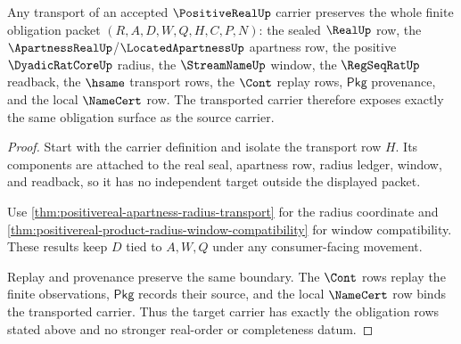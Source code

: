\begin{theorem}
\label{thm:positive-real-carrier-transport}
Any transport of an accepted $\PositiveRealUp$ carrier preserves the whole
finite obligation packet
$(R,A,D,W,Q,H,C,P,N)$: the sealed $\RealUp$ row, the
$\ApartnessRealUp$/$\LocatedApartnessUp$ apartness row, the positive
$\DyadicRatCoreUp$ radius, the $\StreamNameUp$ window, the $\RegSeqRatUp$
readback, the $\hsame$ transport rows, the $\Cont$ replay rows,
$\mathsf{Pkg}$ provenance, and the local $\NameCert$ row. The transported
carrier therefore exposes exactly the same obligation surface as the source
carrier.
\end{theorem}
\begin{proof}
Start with the carrier definition and isolate the transport row $H$. Its
components are attached to the real seal, apartness row, radius ledger,
window, and readback, so it has no independent target outside the displayed
packet.

Use \autoref{thm:positivereal-apartness-radius-transport} for the radius
coordinate and \autoref{thm:positivereal-product-radius-window-compatibility}
for window compatibility. These results keep $D$ tied to $A,W,Q$ under any
consumer-facing movement.

Replay and provenance preserve the same boundary. The $\Cont$ rows replay the
finite observations, $\mathsf{Pkg}$ records their source, and the local
$\NameCert$ row binds the transported carrier. Thus the target carrier has
exactly the obligation rows stated above and no stronger real-order or
completeness datum.
\end{proof}


\begin{closurestatus}{\PositiveRealUp}
  \theoryclosure{\matureClosure}
  \formalstatus{\unformalizedV}
\end{closurestatus}
